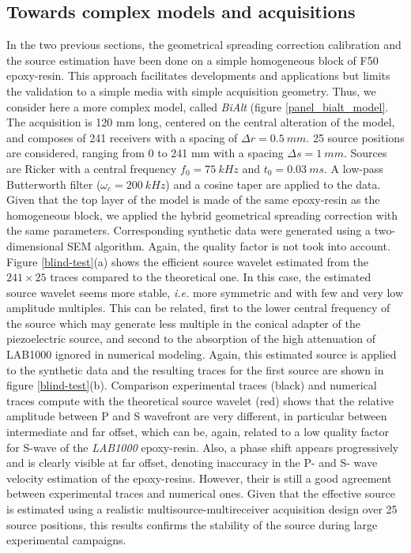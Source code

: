 \documentclass[manuscript,revised]{geophysics}
\newcommand{\twod}{two-dimensional }
\begin{document}
\subsection{Towards complex models and acquisitions}

\noindent In the two previous sections, the geometrical spreading correction calibration and the source estimation have been done on a simple homogeneous block of F50 epoxy-resin. This approach facilitates developments and applications but limits the validation to a simple media with simple acquisition geometry. Thus, we consider here a more complex model, called \textit{BiAlt} (figure \ref{panel_bialt_model}. The acquisition is 120 mm long, centered on the central alteration of the model, and composes of 241 receivers with a spacing of $\Delta r=0.5\ mm$. 25 source positions are considered, ranging from 0 to 241 mm with a spacing $\Delta s=1\ mm$. Sources are Ricker with a central frequency $f_{0}=75\ kHz$ and $t_{0}=0.03\ ms$. A low-pass Butterworth filter ($\omega_{c}=200\ kHz$) and a cosine taper are applied to the data. Given that the top layer of the model is made of the same epoxy-resin as the homogeneous block, we applied the hybrid geometrical spreading correction with the same parameters. Corresponding synthetic data were generated using a \twod  SEM algorithm. Again, the quality factor is not took into account. Figure \ref{blind-test}(a) shows the efficient source wavelet estimated from the $241 \times 25$ traces compared to the theoretical one. In this case, the estimated source wavelet seems more stable, \textit{i.e.} more symmetric and with few and very low amplitude multiples. This can be related, first to the lower central frequency of the source which may generate less multiple in the conical adapter of the piezoelectric source, and second to the absorption of the high attenuation of LAB1000 ignored in numerical modeling. Again, this estimated source is applied to the synthetic data and the resulting traces  for the first source are shown in figure \ref{blind-test}(b). Comparison experimental traces (black) and numerical traces compute with the theoretical source wavelet (red) shows that the relative amplitude between P and S wavefront are very different, in particular between intermediate and far offset, which can be, again, related to a low quality factor for S-wave of the \textit{LAB1000} epoxy-resin. Also, a phase shift appears progressively and is clearly visible at far offset, denoting inaccuracy in the P- and S- wave velocity estimation of the epoxy-resins. However, their is still a good agreement between experimental traces and numerical ones. Given that the effective source is estimated using a realistic multisource-multireceiver acquisition design over 25 source positions, this results confirms the stability of the source during large experimental campaigns.     
\end{document}
